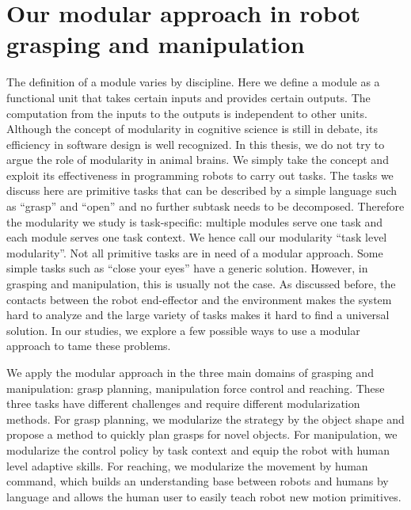 \section{Our modular approach in robot grasping and manipulation}
\label{cha1:contribution}
The definition of a module varies by discipline. Here we define a module as a functional unit that takes certain inputs and provides certain outputs. The computation from the inputs to the outputs is independent to other units. Although the concept of modularity in cognitive science is still in debate, its efficiency in software design is well recognized. In this thesis, we do not try to argue the role of modularity in animal brains. We simply take the concept and exploit its effectiveness in programming robots to carry out tasks. The tasks we discuss here are primitive tasks that can be described by a simple language such as ``grasp'' and ``open'' and no further subtask needs to be decomposed. Therefore the modularity we study is task-specific: multiple modules serve one task and each module serves one task context. We hence call our modularity ``task level modularity''. Not all primitive tasks are in need of a modular approach. Some simple tasks such as ``close your eyes'' have a generic solution. However, in grasping and manipulation, this is usually not the case. As discussed before, the contacts between the robot end-effector and the environment makes the system hard to analyze and the large variety of tasks makes it hard to find a universal solution. In our studies, we explore a few possible ways to use a modular approach to tame these problems.


We apply the modular approach in the three main domains of grasping and manipulation: grasp planning, manipulation force control and reaching. These three tasks have different challenges and require different modularization methods. For grasp planning, we modularize the strategy by the object shape and propose a method to quickly plan grasps for novel objects. For manipulation, we modularize the control policy by task context and equip the robot with human level adaptive skills. For reaching, we modularize the movement by human command, which builds an understanding base between robots and humans by language and allows the human user to easily teach robot new motion primitives.

